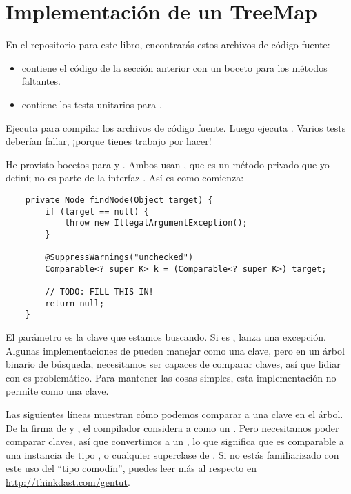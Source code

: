 \documentclass[12pt]{book}
\theoremstyle{exercise}
\begin{document}
\section{Implementación de un TreeMap}


En el repositorio para este libro, encontrarás estos archivos de código fuente:

\begin{itemize}

\item
   contiene el código de la sección anterior con un boceto
  para los métodos faltantes.

\item
   contiene los tests unitarios para
  .

\end{itemize}

Ejecuta  para compilar los archivos de código fuente. Luego ejecuta
.  Varios tests deberían fallar, ¡porque tienes trabajo por
hacer!


He provisto bocetos para  y .  Ambos usan
, que es un método privado que yo definí; no es parte
de la interfaz . Así es como comienza:

\begin{verbatim}
    private Node findNode(Object target) {
        if (target == null) {
            throw new IllegalArgumentException();
        }

        @SuppressWarnings("unchecked")
        Comparable<? super K> k = (Comparable<? super K>) target;

        // TODO: FILL THIS IN!
        return null;
    }
\end{verbatim}


El parámetro  es la clave que estamos buscando. Si
 es ,  lanza una excepción.
Algunas implementaciones de  pueden manejar  como una clave,
pero en un árbol binario de búsqueda, necesitamos ser capaces de comparar
claves, así que lidiar con  es problemático. Para mantener las cosas
simples, esta implementación no permite  como una clave.

Las siguientes líneas muestran cómo podemos comparar  a una clave
en el árbol. De la firma de  y , el compilador
considera a  como un . Pero necesitamos poder
comparar claves, así que convertimos  a un
, lo que significa que
es comparable a una instancia de tipo , o cualquier superclase de
.  Si no estás familiarizado con este uso del ``tipo comodín'', 
puedes leer más al respecto en
\url{http://thinkdast.com/gentut}.
\end{document}

